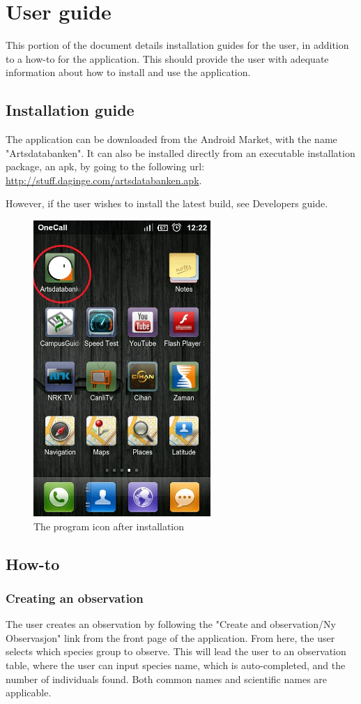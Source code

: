 \newpage
\section{User guide}
This portion of the document details installation guides for the user, in addition to a how-to for the application. This should provide the user with adequate information about how to install and use the application.
\subsection{Installation guide}
The application can be downloaded from the Android Market, with the name "Artsdatabanken". It can also be installed directly from an executable installation package, an apk, by going to the following url: \url{http://stuff.daginge.com/artsdatabanken.apk}.

However, if the user wishes to install the latest build, see Developers guide.

\begin{figure}[h!]
\centering
 \includegraphics[width=0.6\textwidth,height=0.9\textwidth]{appendix/pic/run.jpg} 
 \caption{The program icon after installation}
 \end{figure}

\subsection{How-to}
\subsubsection{Creating an observation}
The user creates an observation by following the "Create and observation/Ny Observasjon" link from the front page of the application.
From here, the user selects which species group to observe. 
This will lead the user to an observation table, where the user can input species name, which is auto-completed, and the number of individuals found. 
Both common names and scientific names are applicable. 

